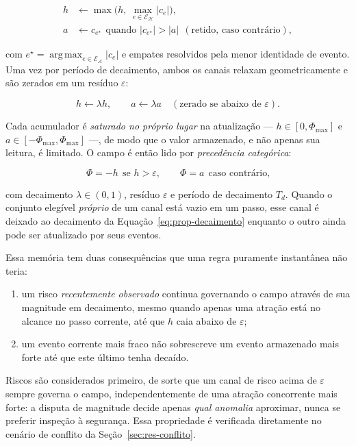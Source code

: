 \begin{align}
\label{eq:prop-canais}
h &\leftarrow \max\!\big(h,\ \textstyle\max_{e\in\mathcal{E}_{\mathcal{H}}}|c_e|\big),\\
a &\leftarrow c_{e^\star}\ \ \text{quando } |c_{e^\star}|>|a|\ \ (\text{retido, caso contrário}),
\end{align}

com $e^\star=\operatorname*{arg\,max}_{e\in\mathcal{E}_{\mathcal{A}}}|c_e|$ e empates
resolvidos pela menor identidade de evento. Uma vez por período de decaimento, ambos
os canais relaxam geometricamente e são zerados em um resíduo $\varepsilon$:

\begin{equation}
\label{eq:prop-decaimento}
h\leftarrow\lambda h,\qquad a\leftarrow\lambda a\quad(\text{zerado se abaixo de }\varepsilon).
\end{equation}

Cada acumulador é \emph{saturado no próprio lugar} na atualização ---
$h\in[0,\Phi_{\max}]$ e $a\in[-\Phi_{\max},\Phi_{\max}]$ ---, de modo que o valor
armazenado, e não apenas sua leitura, é limitado. O campo é então lido por
\emph{precedência categórica}:

\begin{equation}
\label{eq:prop-precedencia}
\Phi=-h\ \ \text{se } h>\varepsilon,\qquad
\Phi=a\ \ \text{caso contrário,}
\end{equation}

com decaimento $\lambda\in(0,1)$, resíduo $\varepsilon$ e período de decaimento
$T_d$. Quando o conjunto elegível \emph{próprio} de um canal está vazio em um passo,
esse canal é deixado ao decaimento da Equação~\eqref{eq:prop-decaimento} enquanto o
outro ainda pode ser atualizado por seus eventos.

Essa memória tem duas consequências que uma regra puramente instantânea não teria:

\begin{enumerate}
    \item um risco \emph{recentemente observado} continua governando o campo através
    de sua magnitude em decaimento, mesmo quando apenas uma atração está no alcance no
    passo corrente, até que $h$ caia abaixo de $\varepsilon$;
    \item um evento corrente mais fraco não sobrescreve um evento armazenado mais
    forte até que este último tenha decaído.
\end{enumerate}

Riscos são considerados primeiro, de sorte que um canal de risco acima de
$\varepsilon$ sempre governa o campo, independentemente de uma atração concorrente
mais forte: a disputa de magnitude decide apenas \emph{qual anomalia} aproximar,
nunca se preferir inspeção à segurança. Essa propriedade é verificada diretamente no
cenário de conflito da Seção~\ref{sec:res-conflito}.

